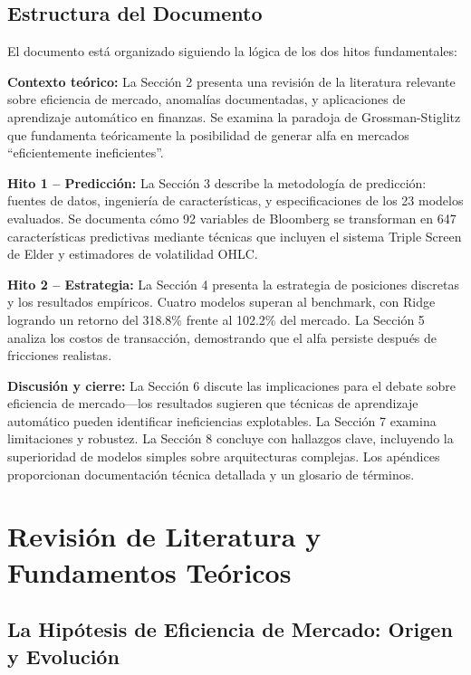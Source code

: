\documentclass[11pt,a4paper]{article}
\begin{document}
\subsection{Estructura del Documento}

El documento está organizado siguiendo la lógica de los dos hitos fundamentales:

\textbf{Contexto teórico:} La Sección 2 presenta una revisión de la literatura relevante sobre eficiencia de mercado, anomalías documentadas, y aplicaciones de aprendizaje automático en finanzas. Se examina la paradoja de Grossman-Stiglitz que fundamenta teóricamente la posibilidad de generar alfa en mercados ``eficientemente ineficientes''.

\textbf{Hito 1 -- Predicción:} La Sección 3 describe la metodología de predicción: fuentes de datos, ingeniería de características, y especificaciones de los 23 modelos evaluados. Se documenta cómo 92 variables de Bloomberg se transforman en 647 características predictivas mediante técnicas que incluyen el sistema Triple Screen de Elder y estimadores de volatilidad OHLC.

\textbf{Hito 2 -- Estrategia:} La Sección 4 presenta la estrategia de posiciones discretas y los resultados empíricos. Cuatro modelos superan al benchmark, con Ridge logrando un retorno del 318.8\% frente al 102.2\% del mercado. La Sección 5 analiza los costos de transacción, demostrando que el alfa persiste después de fricciones realistas.

\textbf{Discusión y cierre:} La Sección 6 discute las implicaciones para el debate sobre eficiencia de mercado---los resultados sugieren que técnicas de aprendizaje automático pueden identificar ineficiencias explotables. La Sección 7 examina limitaciones y robustez. La Sección 8 concluye con hallazgos clave, incluyendo la superioridad de modelos simples sobre arquitecturas complejas. Los apéndices proporcionan documentación técnica detallada y un glosario de términos.

\section{Revisión de Literatura y Fundamentos Teóricos}

\subsection{La Hipótesis de Eficiencia de Mercado: Origen y Evolución}
\end{document}
